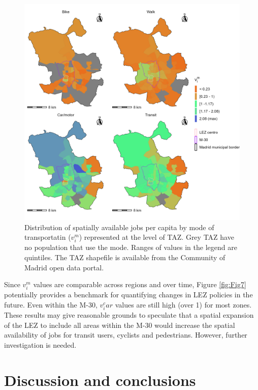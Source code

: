 \documentclass[10pt,letterpaper]{article}
\begin{document}
\begin{figure}

{\centering \includegraphics[width=0.85\linewidth]{images/Fig7} 

}

\caption{\label{fig:Fig7} Distribution of spatially available jobs per capita by mode of transportatin ($v_i^m$) represented at the level of TAZ. Grey TAZ have no population that use the mode. Ranges of values in the legend are quintiles. The TAZ shapefile is available from the Community of Madrid open data portal.}\label{fig:SA-per-capita-m-plot}
\end{figure}

Since \(v_i^m\) values are comparable across regions and over time,
Figure \ref{fig:Fig7} potentially provides a benchmark for quantifying
changes in LEZ policies in the future. Even within the M-30, \(v_i^car\)
values are still high (over 1) for most zones. These results may give
reasonable grounds to speculate that a spatial expansion of the LEZ to
include all areas within the M-30 would increase the spatial
availability of jobs for transit users, cyclists and pedestrians.
However, further investigation is needed.

\hypertarget{discussion-and-conclusions}{%
\section{Discussion and conclusions}\label{discussion-and-conclusions}}
\end{document}
